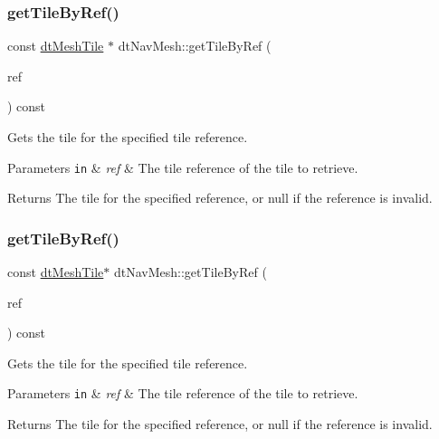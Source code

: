 \subsubsection{\texorpdfstring{get\+Tile\+By\+Ref()}{getTileByRef()}\hspace{0.1cm}{\footnotesize\ttfamily [1/2]}}
{\footnotesize\ttfamily const \hyperlink{structdtMeshTile}{dt\+Mesh\+Tile} $\ast$ dt\+Nav\+Mesh\+::get\+Tile\+By\+Ref (\begin{DoxyParamCaption}\item[{\hyperlink{group__detour_ga7ea56cfe01bd7c34a81d821d94cbeea5}{dt\+Tile\+Ref}}]{ref }\end{DoxyParamCaption}) const}

Gets the tile for the specified tile reference. 
\begin{DoxyParams}[1]{Parameters}
\mbox{\tt in}  & {\em ref} & The tile reference of the tile to retrieve. \\
\hline
\end{DoxyParams}
\begin{DoxyReturn}{Returns}
The tile for the specified reference, or null if the reference is invalid. 
\end{DoxyReturn}
\mbox{\label{classdtNavMesh_ac0e0ca5289ea49b392501662d6dd9c39}} 
\subsubsection{\texorpdfstring{get\+Tile\+By\+Ref()}{getTileByRef()}\hspace{0.1cm}{\footnotesize\ttfamily [2/2]}}
{\footnotesize\ttfamily const \hyperlink{structdtMeshTile}{dt\+Mesh\+Tile}$\ast$ dt\+Nav\+Mesh\+::get\+Tile\+By\+Ref (\begin{DoxyParamCaption}\item[{\hyperlink{group__detour_ga7ea56cfe01bd7c34a81d821d94cbeea5}{dt\+Tile\+Ref}}]{ref }\end{DoxyParamCaption}) const}

Gets the tile for the specified tile reference. 
\begin{DoxyParams}[1]{Parameters}
\mbox{\tt in}  & {\em ref} & The tile reference of the tile to retrieve. \\
\hline
\end{DoxyParams}
\begin{DoxyReturn}{Returns}
The tile for the specified reference, or null if the reference is invalid. 
\end{DoxyReturn}
\mbox{\label{classdtNavMesh_a6027a9a6f032dfd6a3b72563f17d80d7}} 
